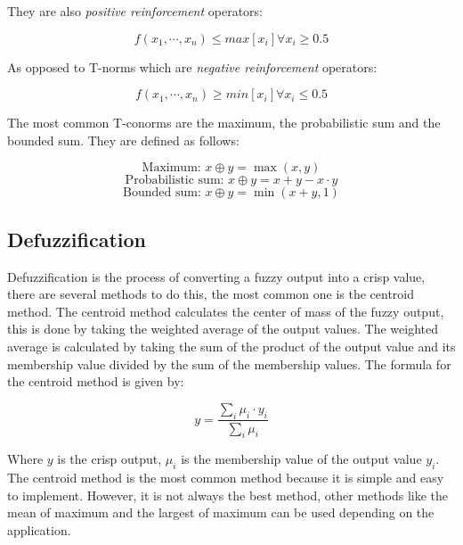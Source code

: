 They are also \textit{positive reinforcement} operators:

\begin{equation}
	f(x_1, \cdots, x_n) \leq max[x_i] \forall x_i \geq 0.5
\end{equation}

As opposed to T-norms which are \textit{negative reinforcement} operators:

\begin{equation}
	f(x_1, \cdots, x_n) \geq min[x_i] \forall x_i \leq 0.5
\end{equation}

The most common T-conorms are the maximum, the probabilistic sum and the bounded sum. They are defined as follows:

\begin{minipage}{0.9624\textwidth}
	\begin{equation}
		\text{Maximum: } x \oplus y = \max(x, y)
	\end{equation}
	\begin{equation}
		\text{Probabilistic sum: } x \oplus y = x + y - x \cdot y
	\end{equation}
	\begin{equation}
		\text{Bounded sum: } x \oplus y = \min(x + y, 1)
	\end{equation}
\end{minipage}

\subsection{Defuzzification}
\label{subsec:fuzzy-defuzzification}

Defuzzification is the process of converting a fuzzy output into a crisp value, there are several methods to do this,
the most common one is the centroid method. The centroid method calculates the center of mass of the fuzzy output, this
is done by taking the weighted average of the output values. The weighted average is calculated by taking the sum of
the product of the output value and its membership value divided by the sum of the membership values. The formula for
the centroid method is given by:

\begin{equation}
	y = \frac{\sum_{i} \mu_i \cdot y_i}{\sum_{i} \mu_i}
\end{equation}

Where $y$ is the crisp output, $\mu_i$ is the membership value of the output value $y_i$. The centroid method is the
most common method because it is simple and easy to implement. However, it is not always the best method, other methods
like the mean of maximum and the largest of maximum can be used depending on the application.

